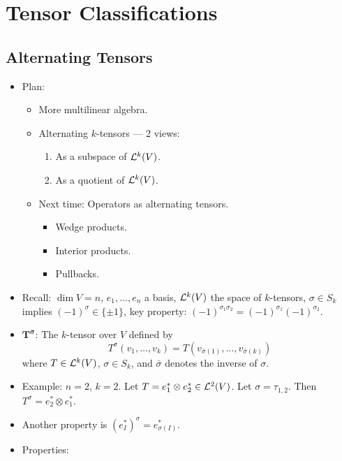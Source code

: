 \documentclass[../notes.tex]{subfiles}
\begin{document}
\chapter{Tensor Classifications}
\section{Alternating Tensors}
\begin{itemize}
    \item {}Plan:
    \begin{itemize}
        \item More multilinear algebra.
        \item Alternating $k$-tensors --- 2 views:
        \begin{enumerate}
            \item As a subspace of $\lin[k]{V}$.
            \item As a quotient of $\lin[k]{V}$.
        \end{enumerate}
        \item Next time: Operators as alternating tensors.
        \begin{itemize}
            \item Wedge products.
            \item Interior products.
            \item Pullbacks.
        \end{itemize}
    \end{itemize}
    \item Recall: $\dim V=n$, $e_1,\dots,e_n$ a basis, $\lin[k]{V}$ the space of $k$-tensors, $\sigma\in S_k$ implies $(-1)^\sigma\in\{\pm 1\}$, key property: $(-1)^{\sigma_1\sigma_2}=(-1)^{\sigma_1}(-1)^{\sigma_2}$.
    \item $\bm{T^\sigma}$: The $k$-tensor over $V$ defined by
    \begin{equation*}
        T^\sigma(v_1,\dots,v_k) = T(v_{\bar{\sigma}(1)},\dots,v_{\bar{\sigma}(k)})
    \end{equation*}
    where $T\in\lin[k]{V}$, $\sigma\in S_k$, and $\bar{\sigma}$ denotes the inverse of $\sigma$.
    \item Example: $n=2$, $k=2$. Let $T=e_1^*\otimes e_2^*\in\lin[2]{V}$. Let $\sigma=\tau_{1,2}$. Then $T^\sigma=e_2^*\otimes e_1^*$.
    \item Another property is $(e_I^*)^\sigma=e_{\sigma(I)}^*$.
    \item Properties:
    \begin{enumerate}

\end{enumerate}
\end{itemize}
\end{document}
